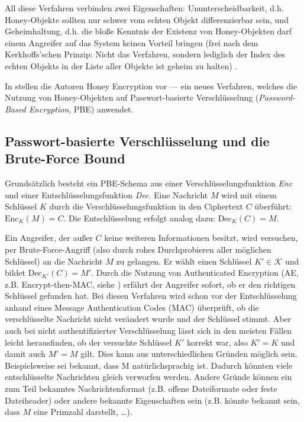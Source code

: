 All diese Verfahren verbinden zwei Eigenschaften: Ununterscheidbarkeit, d.h. Honey-Objekte sollten nur schwer vom echten Objekt differenzierbar sein, und Geheimhaltung, d.h. die bloße Kenntnis der Existenz von Honey-Objekten darf einem Angreifer auf das System keinen Vorteil bringen (frei nach dem Kerkhoffs'schen Prinzip: Nicht das Verfahren, sondern lediglich der Index des echten Objekts in der Liste aller Objekte ist geheim zu halten) \cite{SACMAT2014}.

In \cite{EURO2014} stellen die Autoren Honey Encryption vor --- ein neues Verfahren, welches die Nutzung von Honey-Objekten auf Passwort-basierte Verschlüsselung (\textit{Password-Based Encryption}, PBE) anwendet.

\subsection{Passwort-basierte Verschlüsselung und die Brute-Force Bound}

Grundsätzlich besteht ein PBE-Schema aus einer Verschlüsselungsfunktion \textit{Enc} und einer Entschlüsselungsfunktion \textit{Dec}. Eine Nachricht \(M\) wird mit einem Schlüssel \(K\) durch die Verschlüsselungsfunktion in den Ciphertext \(C\) überführt: \(\text{Enc}_K(M)=C\). Die Entschlüsselung erfolgt analog dazu: \(\text{Dec}_K(C)=M\).

Ein Angreifer, der außer \(C\) keine weiteren Informationen besitzt, wird versuchen, per Brute-Force-Angriff (also durch rohes Durchprobieren aller möglichen Schlüssel) an die Nachricht \(M\) zu gelangen. Er wählt einen Schlüssel \(K' \in \mathcal{K}\) und bildet \(\text{Dec}_{K'}(C)=M'\). Durch die Nutzung von Authenticated Encryption (AE, z.B. Encrypt-then-MAC, siehe \cite{AE2000}) erfährt der Angreifer sofort, ob er den richtigen Schlüssel gefunden hat. Bei diesen Verfahren wird schon vor der Entschlüsselung anhand eines Message Authentication Codes (MAC) überprüft, ob die verschlüsselte Nachricht nicht verändert wurde und der Schlüssel stimmt. Aber auch bei nicht authentifizierter Verschlüsselung lässt sich in den meisten Fällen leicht herausfinden, ob der versuchte Schlüssel \(K'\) korrekt war, also \(K'=K\) und damit auch \(M'=M\) gilt. Dies kann aus unterschiedlichen Gründen möglich sein. Beispielsweise sei bekannt, dass M natürlichsprachig ist. Dadurch könnten viele entschlüsselte Nachrichten gleich verworfen werden. Andere Gründe können ein zum Teil bekanntes Nachrichtenformat (z.B. offene Dateiformate oder feste Dateiheader) oder andere bekannte Eigenschaften sein (z.B. könnte bekannt sein, dass \(M\) eine Primzahl darstellt, \dots).

